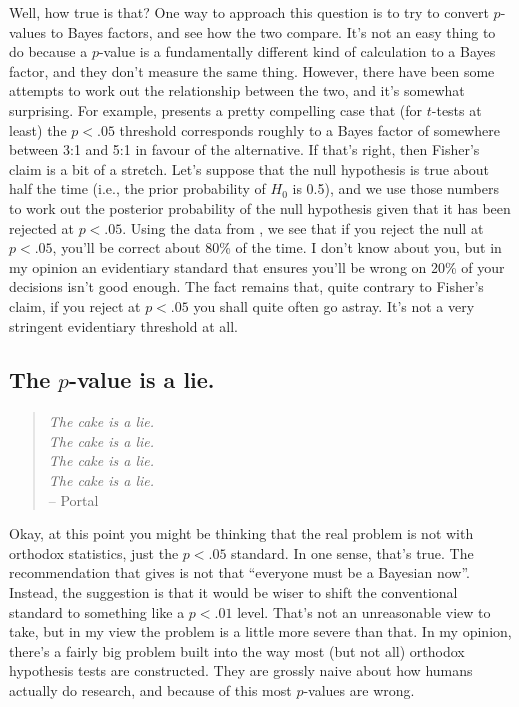 Well, how true is that? One way to approach this question is to try to convert $p$-values to Bayes factors, and see how the two compare. It's not an easy thing to do because a $p$-value is a fundamentally different kind of calculation to a Bayes factor, and they don't measure the same thing. However, there have been some attempts to work out the relationship between the two, and it's somewhat surprising. For example, \textcite{Johnson2013} presents a pretty compelling case that (for $t$-tests at least) the  $p<.05$ threshold corresponds roughly to a Bayes factor of somewhere between 3:1 and 5:1 in favour of the alternative. If that's right, then Fisher's claim is a bit of a stretch. Let's suppose that the null hypothesis is true about half the time (i.e., the prior probability of $H_0$ is 0.5), and we use those numbers to work out the posterior probability of the null hypothesis given that it has been rejected at $p<.05$. Using the data from \textcite{Johnson2013}, we see that if you reject the null at $p<.05$, you'll be correct about 80\% of the time. I don't know about you, but in my opinion an evidentiary standard that ensures you'll be wrong on 20\% of your decisions isn't good enough. The fact remains that, quite contrary to Fisher's claim, if you reject at $p<.05$ you shall quite often go astray. It's not a very stringent evidentiary threshold at all. 


\subsection{The $p$-value is a lie.}

\begin{quote}
{\it The cake is a lie.} \\ 
{\it The cake is a lie.} \\ 
{\it The cake is a lie.} \\ 
{\it The cake is a lie.} \\ 
\hspace*{1cm} -- Portal
\end{quote}

Okay, at this point you might be thinking that the real problem is not with orthodox statistics, just the $p<.05$ standard. In one sense, that's true. The recommendation that \textcite{Johnson2013} gives is not that ``everyone must be a Bayesian now''. Instead, the suggestion is that it would be wiser to shift the conventional standard to something like a $p<.01$ level. That's not an unreasonable view to take, but in my view the problem is a little more severe than that. In my opinion, there's a fairly big problem built into the way most (but not all) orthodox hypothesis tests are constructed. They are grossly naive about how humans actually do research, and because of this most $p$-values are wrong. 


